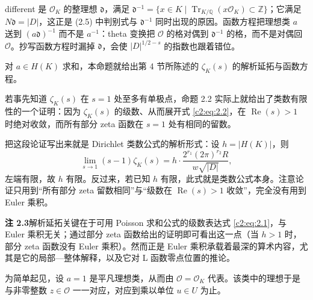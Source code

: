 \begin{annote}
different 是 $\mathcal{O}_K$ 的整理想 $\mathfrak{d}$，满足 $\mathfrak{d}^{-1}=\{x\in K\mid \operatorname{Tr}_{K/\mathbb{Q}}(x\mathcal{O}_K)\subset\mathbb{Z}\}$；它满足 $N\mathfrak{d}=|D|$，这正是 (2.5) 中判别式与 $\mathfrak{d}^{-1}$ 同时出现的原因。函数方程把理想类 $a$ 送到 $(a\mathfrak{d})^{-1}$ 而不是 $a^{-1}$：theta 变换把 $\mathcal{O}$ 的格对偶到 $\mathfrak{d}^{-1}$ 的格，而不是对偶回 $\mathcal{O}$。抄写函数方程时漏掉 $\mathfrak{d}$，会使 $|D|^{1/2-s}$ 的指数也跟着错位。
\par\vspace{0.15em}{\raggedleft 【来源：Lang《Algebraic Number Theory》Ch.~XIII（A）；Milne《Algebraic Number Theory》zeta 函数一章（A）】\par}
\end{annote}

对 $a\in H(K)$ 求和，本命题就给出第 4 节所陈述的 $\zeta_K(s)$ 的解析延拓与函数方程。

若事先知道 $\zeta_K(s)$ 在 $s=1$ 处至多有单极点，命题 2.2 实际上就给出了类数有限性的一个证明：因为 $\zeta_K(s)$ 的级数、从而展开式 \eqref{c2:eq:2.2}，在 $\operatorname{Re}(s)>1$ 时绝对收敛，而所有部分 zeta 函数在 $s=1$ 处有相同的留数。

\begin{annote}
把这段论证写出来就是 Dirichlet 类数公式的解析形式：设 $h=|H(K)|$，则
\[
\lim_{s\to1}(s-1)\zeta_K(s)=h\cdot\frac{2^{r_1}(2\pi)^{r_2}R}{w\sqrt{|D|}},
\]
左端有限，故 $h$ 有限。反过来，若已知 $h$ 有限，此式就是类数公式本身。注意论证只用到“所有部分 zeta 留数相同”与“级数在 $\operatorname{Re}(s)>1$ 收敛”，完全没有用到 Euler 乘积。
\par\vspace{0.15em}{\raggedleft 【来源：Lang 前引书 Ch.~XIII（A）；Milne 前引书（A）；原书命题 2.2（A）】\par}
\end{annote}

\par\medskip\noindent\textbf{注 2.3}\quad 解析延拓关键在于可用 Poisson 求和公式的级数表达式 \eqref{c2:eq:2.1}，与 Euler 乘积无关；通过部分 zeta 函数给出的证明即可看出这一点（当 $h>1$ 时，部分 zeta 函数没有 Euler 乘积）。然而正是 Euler 乘积承载着最深的算术内容，尤其是它的局部—整体解释，以及它对 L 函数零点位置的推论。

为简单起见，设 $a=1$ 是平凡理想类，从而由 $\mathcal{O}=\mathcal{O}_K$ 代表。该类中的理想于是与非零整数 $z\in\mathcal{O}$ 一一对应，对应到乘以单位 $u\in U$ 为止。

